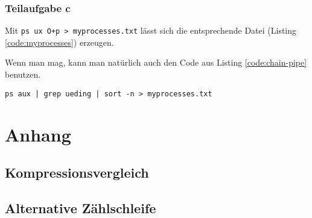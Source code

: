 \subsection{Teilaufgabe c}
Mit \verb#ps ux O+p > myprocesses.txt# lässt sich die entsprechende Datei (Listing \ref{code:myprocesses}) erzeugen.

 


Wenn man mag, kann man natürlich auch den Code aus Listing \ref{code:chain-pipe} benutzen.

\begin{lstlisting}[caption=verkettete Pipes, label=code:chain-pipe, float=htb]
ps aux | grep ueding | sort -n > myprocesses.txt
\end{lstlisting}

\chapter{Anhang}


\section{Kompressionsvergleich}
\label{listing:compression}


\section{Alternative Zählschleife}
\label{listing:zahlen2}


 

